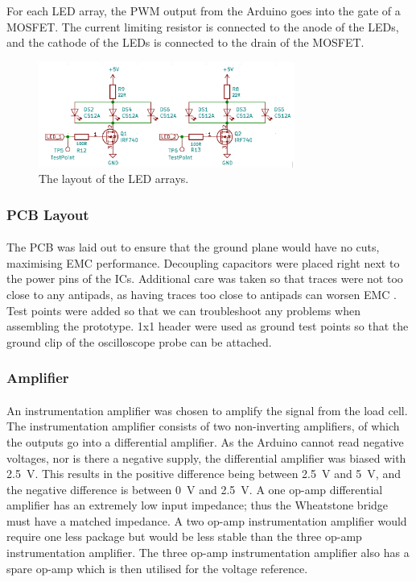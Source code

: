 \documentclass[twoside]{article}
\begin{document}
        For each LED array, the PWM output from the Arduino goes into the gate of a MOSFET. The current limiting resistor is connected to the anode of the LEDs, and the cathode of the LEDs is connected to the drain of the MOSFET.
        \noindent
        \begin{figure}[H]
            \centering
            \includegraphics[width=0.75\textwidth]{ledarray.png}
            \caption{The layout of the LED arrays.}
            \label{fig:led}
        \end{figure}

        \subsubsection{PCB Layout}
        \paragraph{}
        The PCB was laid out to ensure that the ground plane would have no cuts, maximising EMC performance. Decoupling capacitors were placed right next to the power pins of the ICs. Additional care was taken so that traces were not too close to any antipads, as having traces too close to antipads can worsen EMC \cite{emc}. Test points were added so that we can troubleshoot any problems when assembling the prototype. 1x1 header were used as ground test points so that the ground clip of the oscilloscope probe can be attached.

        \subsubsection{Amplifier}
        \paragraph{}
        An instrumentation amplifier was chosen to amplify the signal from the load cell. The instrumentation amplifier consists of two non-inverting amplifiers, of which the outputs go into a differential amplifier. As the Arduino cannot read negative voltages, nor is there a negative supply, the differential amplifier was biased with \SI{2.5}{\volt}. This results in the positive difference being between \SI{2.5}{\volt} and \SI{5}{\volt}, and the negative difference is between \SI{0}{\volt} and \SI{2.5}{\volt}. A one op-amp differential amplifier has an extremely low input impedance; thus the Wheatstone bridge must have a matched impedance. A two op-amp instrumentation amplifier would require one less package but would be less stable than the three op-amp instrumentation amplifier. The three op-amp instrumentation amplifier also has a spare op-amp which is then utilised for the voltage reference.
\end{document}
